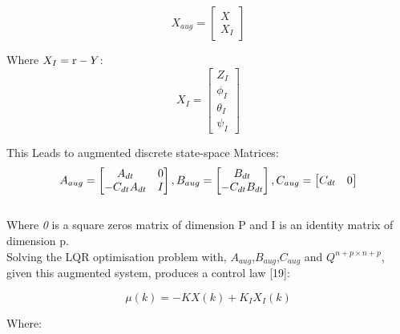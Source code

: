 \documentclass[12pt,a4paper,twoside]{report}
\begin{document}
				\begin{equation}
					X_{aug} = 
					\begin{bmatrix}
						X \\
						X_I
					\end{bmatrix}
				\end{equation}
				
				Where 	\(X_I = \emph{\emph{r}} - Y \):
				\begin{equation}
					X_I =
					\begin{bmatrix}
						Z_I \\
						\phi_I\\
						\theta_I\\
						\psi_I
					\end{bmatrix}
				\end{equation}
				
				This Leads to augmented discrete state-space Matrices:
				\\
				\begin{equation}
					A_{aug} =
					\begin{bmatrix}
						A_{dt} & \emph{\emph{0}} \\
						-C_{dt}A_{dt} & I
					\end{bmatrix}
					,
					B_{aug} =
					\begin{bmatrix}
						B_{dt}\\
						-C_{dt}B_{dt}
					\end{bmatrix}
					,
					C_{aug} =
					\begin{bmatrix}
						C_{dt} & \emph{\emph{0}}
					\end{bmatrix}
				\end{equation}
				\\   
				Where \emph{\emph{0}} is a square zeros matrix of dimension P and I is an identity matrix of dimension p.
				\\
				Solving the LQR optimisation problem with, $A_{aug}$,$B_{aug}$,$C_{aug}$ and $Q^{n+p \times n+p}$, given this augmented system, produces a control law [19]: 
				
				\begin{equation}
					\mu(k) = - K X(k) + K_I X_I(k)
				\end{equation}
				
				Where:
				
\end{document}
